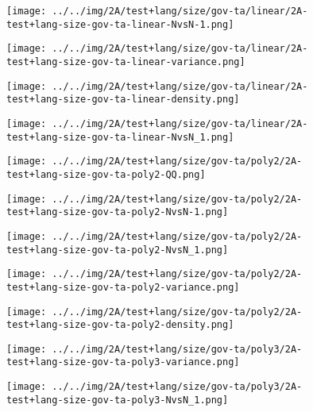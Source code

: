 \begin{figure}[H]
\centering	\texttt{[image: ../../img/2A/test+lang/size/gov-ta/linear/2A-test+lang-size-gov-ta-linear-NvsN-1.png]}
\end{figure}
\begin{figure}[H]
\centering	\texttt{[image: ../../img/2A/test+lang/size/gov-ta/linear/2A-test+lang-size-gov-ta-linear-variance.png]}
\end{figure}
\begin{figure}[H]
\centering	\texttt{[image: ../../img/2A/test+lang/size/gov-ta/linear/2A-test+lang-size-gov-ta-linear-density.png]}
\end{figure}
\begin{figure}[H]
\centering	\texttt{[image: ../../img/2A/test+lang/size/gov-ta/linear/2A-test+lang-size-gov-ta-linear-NvsN\_1.png]}
\end{figure}
\begin{figure}[H]
\centering	\texttt{[image: ../../img/2A/test+lang/size/gov-ta/poly2/2A-test+lang-size-gov-ta-poly2-QQ.png]}
\end{figure}
\begin{figure}[H]
\centering	\texttt{[image: ../../img/2A/test+lang/size/gov-ta/poly2/2A-test+lang-size-gov-ta-poly2-NvsN-1.png]}
\end{figure}
\begin{figure}[H]
\centering	\texttt{[image: ../../img/2A/test+lang/size/gov-ta/poly2/2A-test+lang-size-gov-ta-poly2-NvsN\_1.png]}
\end{figure}
\begin{figure}[H]
\centering	\texttt{[image: ../../img/2A/test+lang/size/gov-ta/poly2/2A-test+lang-size-gov-ta-poly2-variance.png]}
\end{figure}
\begin{figure}[H]
\centering	\texttt{[image: ../../img/2A/test+lang/size/gov-ta/poly2/2A-test+lang-size-gov-ta-poly2-density.png]}
\end{figure}
\begin{figure}[H]
\centering	\texttt{[image: ../../img/2A/test+lang/size/gov-ta/poly3/2A-test+lang-size-gov-ta-poly3-variance.png]}
\end{figure}
\begin{figure}[H]
\centering	\texttt{[image: ../../img/2A/test+lang/size/gov-ta/poly3/2A-test+lang-size-gov-ta-poly3-NvsN\_1.png]}
\end{figure}
